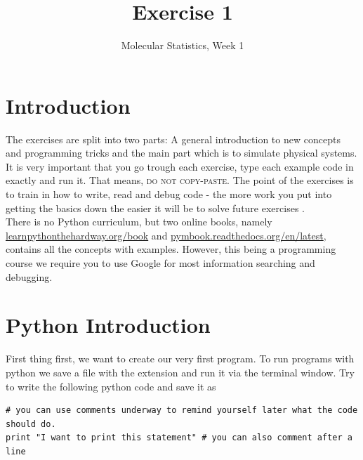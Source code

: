 \documentclass{article}
\title{Exercise 1}
\author{Molecular Statistics, Week 1}
\date{}
\begin{document}

\maketitle

\section*{Introduction}


The exercises are split into two parts: A general introduction to new concepts and programming tricks and the main part which is to simulate physical systems.
It is very important that you go trough each exercise, type each example code in exactly and run it.
That means, \textsc{do not copy-paste}.
The point of the exercises is to train
in how to write, read and debug code - the more work you put into getting the basics down the easier it will be to solve future exercises .\\


There is no Python curriculum, but two online books, namely
\href{http://learnpythonthehardway.org/book/}{learnpythonthehardway.org/book} and
\href{http://pymbook.readthedocs.org/en/latest/}{pymbook.readthedocs.org/en/latest},
contains all the concepts with examples.
However, this being a programming course we require you to use Google for most information searching and debugging.

\newpage
\section{Python Introduction}

First thing first, we want to create our very first program.
To run programs with python we save a file with the extension  and run it via the terminal window.
Try to write the following python code and save it as 

\begin{lstlisting}
# you can use comments underway to remind yourself later what the code should do.
print "I want to print this statement" # you can also comment after a line
\end{lstlisting}
\end{document}

